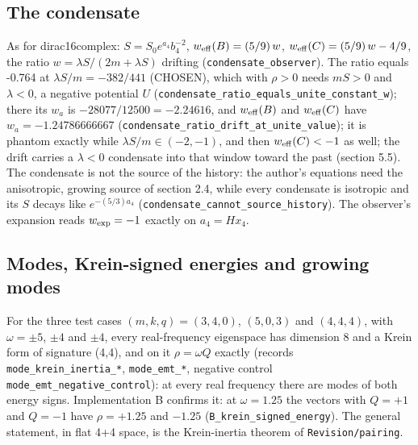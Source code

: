\documentclass[11pt]{article}
\begin{document}
\subsection{The condensate}

As for dirac16complex: $S = S_0e^{a_4}b_4^{-2}$, $w_{\rm eff}(B) = (5/9)\,w$, $w_{\rm eff}(C) = (5/9)\,w - 4/9$, the ratio $w = \lambda S/(2m + \lambda S)$ drifting (\texttt{condensa\allowbreak{}te\_obser\allowbreak{}ver}). The ratio equals -0.764 at $\lambda S/m = -382/441$ (CHOSEN), which with $\rho > 0$ needs $mS > 0$ and $\lambda < 0$, a negative potential $U$ (\texttt{condensa\allowbreak{}te\_ratio\allowbreak{}\_equals\_\allowbreak{}unite\_co\allowbreak{}nstant\_w}); there its $w_a$ is $-28077/12500 = -2.24616$, and $w_{\rm eff}(B)$ and $w_{\rm eff}(C)$ have $w_a = -1.24786666667$ (\texttt{condensa\allowbreak{}te\_ratio\allowbreak{}\_drift\_a\allowbreak{}t\_unite\_\allowbreak{}value}); it is phantom exactly while $\lambda S/m \in (-2, -1)$, and then $w_{\rm eff}(C) < -1$ as well; the drift carries a $\lambda < 0$ condensate into that window toward the past (section 5.5). The condensate is not the source of the history: the author's equations need the anisotropic, growing source of section 2.4, while every condensate is isotropic and its $S$ decays like $e^{-(5/3)a_4}$ (\texttt{condensa\allowbreak{}te\_canno\allowbreak{}t\_source\allowbreak{}\_history}). The observer's expansion reads $w_{\rm exp} = -1$ exactly on $a_4 = Hx_4$.

\subsection{Modes, Krein-signed energies and growing modes}

For the three test cases $(m, k, q) = (3, 4, 0)$, $(5, 0, 3)$ and $(4, 4, 4)$, with $\omega = \pm5$, $\pm4$ and $\pm4$, every real-frequency eigenspace has dimension 8 and a Krein form of signature (4,4), and on it $\rho = \omega Q$ exactly (records \texttt{mode\_kre\allowbreak{}in\_inert\allowbreak{}ia\_*}, \texttt{mode\_emt\allowbreak{}\_*}, negative control \texttt{mode\_emt\allowbreak{}\_negativ\allowbreak{}e\_contro\allowbreak{}l}): at every real frequency there are modes of both energy signs. Implementation B confirms it: at $\omega = 1.25$ the vectors with $Q = +1$ and $Q = -1$ have $\rho = +1.25$ and $-1.25$ (\texttt{B\_krein\_\allowbreak{}signed\_e\allowbreak{}nergy}). The general statement, in flat 4+4 space, is the Krein-inertia theorem of \texttt{Revision\allowbreak{}/pairing}.
\end{document}
